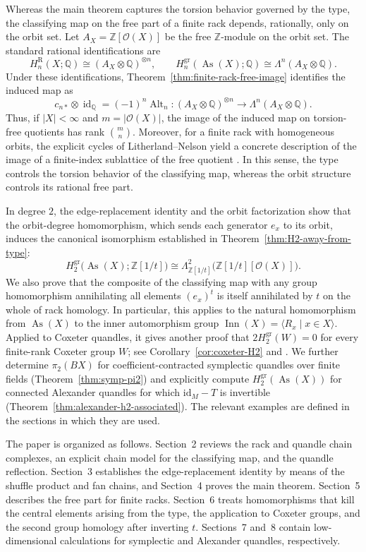 \documentclass[10pt,a4paper]{amsart}
\DeclareMathOperator{\As}{As}
\DeclareMathOperator{\Inn}{Inn}
\newcommand{\ZZ}{\mathbb Z}
\newcommand{\QQ}{\mathbb Q}
\newcommand{\OO}{\mathcal O}
\newcommand{\gr}{\mathrm{gr}}
\newcommand{\R}{\mathrm R}
\begin{document}
Whereas the main theorem captures the torsion behavior governed by the type, the classifying map on the free part of a finite rack depends, rationally, only on the orbit set. Let $A_X=\ZZ[\OO(X)]$ be the free $\ZZ$-module on the orbit set. The standard rational identifications are
\[
 H_n^\R(X;\QQ)\cong(A_X\otimes\QQ)^{\otimes n},
 \qquad
 H_n^{\gr}(\As(X);\QQ)\cong\Lambda^n(A_X\otimes\QQ).
\]
Under these identifications, Theorem~\ref{thm:finite-rack-free-image} identifies the induced map as
\[
        c_{n*}\otimes\operatorname{id}_{\QQ}=(-1)^n\operatorname{Alt}_n
        \colon (A_X\otimes\QQ)^{\otimes n}
        \longrightarrow\Lambda^n(A_X\otimes\QQ).
\]
Thus, if $|X| < \infty$ and $m=|\OO(X)|$, the image of the induced map on torsion-free quotients has rank $\binom{m}{n}$. Moreover, for a finite rack with homogeneous orbits, the explicit cycles of Litherland--Nelson yield a concrete description of the image of a finite-index sublattice of the free quotient \cite{EtingofGrana,LitherlandNelson}. In this sense, the type controls the torsion behavior of the classifying map, whereas the orbit structure controls its rational free part.

In degree $2$, the edge-replacement identity and the orbit factorization show that the orbit-degree homomorphism, which sends each generator $e_x$ to its orbit, induces the canonical isomorphism established in Theorem~\ref{thm:H2-away-from-type}:
\[
 H_2^{\gr}\bigl(\As(X);\ZZ[1/t]\bigr)
 \cong
 \Lambda^2_{\ZZ[1/t]}\bigl(\ZZ[1/t][\OO(X)]\bigr).
\]
We also prove that the composite of the classifying map with any group homomorphism annihilating all elements $(e_x)^t$ is itself annihilated by $t$ on the whole of rack homology. In particular, this applies to the natural homomorphism from $\As(X)$ to the inner automorphism group $\Inn(X)=\langle R_x\mid x\in X\rangle$. Applied to Coxeter quandles, it gives another proof that $2H_2^{\gr}(W)=0$ for every finite-rank Coxeter group $W$; see Corollary~\ref{cor:coxeter-H2} and \cite{AkitaCoxeter,HowlettCoxeter}. We further determine $\pi_2(BX)$ for coefficient-contracted symplectic quandles over finite fields (Theorem~\ref{thm:symp-pi2}) and explicitly compute $H_2^{\gr}(\As(X))$ for connected Alexander quandles for which $\mathrm{id}_M-T$ is invertible (Theorem~\ref{thm:alexander-h2-associated}). The relevant examples are defined in the sections in which they are used.

The paper is organized as follows. Section~2 reviews the rack and quandle chain complexes, an explicit chain model for the classifying map, and the quandle reflection. Section~3 establishes the edge-replacement identity by means of the shuffle product and fan chains, and Section~4 proves the main theorem. Section~5 describes the free part for finite racks. Section~6 treats homomorphisms that kill the central elements arising from the type, the application to Coxeter groups, and the second group homology after inverting $t$. Sections~7 and~8 contain low-dimensional calculations for symplectic and Alexander quandles, respectively.
\end{document}
